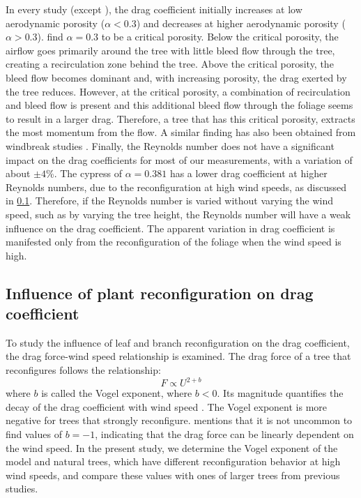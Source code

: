 In every study (except \cite{Hagen1971}), the drag coefficient initially increases at low aerodynamic porosity ($\alpha < 0.3$) and decreases at higher aerodynamic porosity ($\alpha > 0.3$). \cite{Dong2007} find $\alpha = 0.3$ to be a critical porosity. Below the critical porosity, the airflow goes primarily around the tree with little bleed flow through the tree, creating a recirculation zone behind the tree. Above the critical porosity, the bleed flow becomes dominant and, with increasing porosity, the drag exerted by the tree reduces. However, at the critical porosity, a combination of recirculation and bleed flow is present and this additional bleed flow through the foliage seems to result in a larger drag. Therefore, a tree that has this critical porosity, extracts the most momentum from the flow. A similar finding has also been obtained from windbreak studies \citep{Dong2008,Hagen1971,Lee1999}. Finally, the Reynolds number does not have a significant impact on the drag coefficients for most of our measurements, with a variation of about $\pm 4$\%. The cypress of $\alpha=0.381$ has a lower drag coefficient at higher Reynolds numbers, due to the reconfiguration at high wind speeds, as discussed in \cref{subsec:reconfiguration}. Therefore, if the Reynolds number is varied without varying the wind speed, such as by varying the tree height, the Reynolds number will have a weak influence on the drag coefficient. The apparent variation in drag coefficient is manifested only from the reconfiguration of the foliage when the wind speed is high.

\subsection{Influence of plant reconfiguration on drag coefficient}
\label{subsec:reconfiguration}

To study the influence of leaf and branch reconfiguration on the drag coefficient, the drag force-wind speed relationship is examined. The drag force of a tree that reconfigures follows the relationship:
\begin{equation}
F \propto U^{2+b}
\label{eq:vogelrelation}
\end{equation}
where $b$ is called the Vogel exponent, where $b<0$. Its magnitude quantifies the decay of the drag coefficient with wind speed \citep{DeLangre2008,Vogel1989}. The Vogel exponent is more negative for trees that strongly reconfigure. \cite{DeLangre2008} mentions that it is not uncommon to find values of $b=-1$, indicating that the drag force can be linearly dependent on the wind speed. In the present study, we determine the Vogel exponent of the model and natural trees, which have different reconfiguration behavior at high wind speeds, and compare these values with ones of larger trees from previous studies. 

